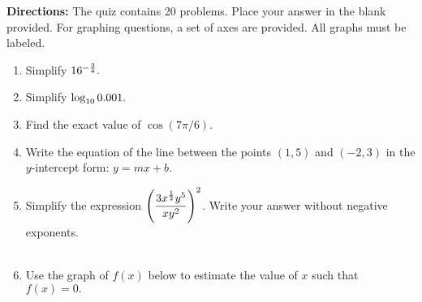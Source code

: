 \documentclass[12pt]{article}
\begin{document}
\textbf{Directions:} The quiz contains 20 problems. Place your answer in the blank provided. For graphing questions, a set of axes are provided. All graphs must be labeled.
\begin{enumerate}
\item Simplify ${\large{16^{-\frac{3}{4}}}}.$

\quad \hfill \underline{\hspace{2in}}
\vfill

\item Simplify ${\large{\log_{10}{0.001}}}.$

\quad \hfill \underline{\hspace{2in}}
\vfill

\item Find the exact value of $\cos ( 7 \pi /6).$

\quad \hfill \underline{\hspace{2in}}
\vfill

\item Write the equation of the line between the points $(1,5)$ and $(-2,3)$ in the $y$-intercept form: $y=mx+b.$\\

\quad \hfill \underline{\hspace{2in}}
\vfill

\item  Simplify the expression $\Large{\displaystyle{\left(\frac{3x^{\frac{1}{2}}y^5}{xy^2} \right)^2}}$. Write your answer without negative exponents.\\
\quad \\

\quad \hfill \underline{\hspace{2in}}
\vfill

\item Use the graph of $f(x)$ below to estimate the value of $x$ such that $f(x)=0.$

\quad \hfill \underline{\hspace{2in}}
\newpage


\end{enumerate}
\end{document}
